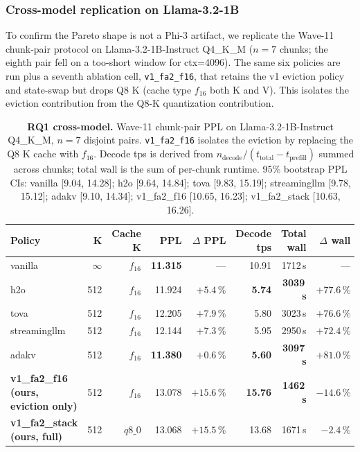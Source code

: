 \documentclass[sigconf, anonymous=false, screen=true]{acmart}
\newcommand{\good}[1]{\textcolor{endurkvgreen}{\textbf{#1}}}
\newcommand{\bad}[1]{\textcolor{endurkvred}{\textbf{#1}}}
\begin{document}
\subsubsection{Cross-model replication on Llama-3.2-1B}
\label{sec:llama1b-wave11}

To confirm the Pareto shape is not a Phi-3 artifact, we replicate the Wave-11 chunk-pair protocol on Llama-3.2-1B-Instruct Q4\_K\_M ($n{=}7$ chunks; the eighth pair fell on a too-short window for ctx=4096). The same six policies are run plus a seventh ablation cell, \texttt{v1\_fa2\_f16}, that retains the v1 eviction policy and state-swap but drops Q8 K (cache type $f_{16}$ both K and V). This isolates the eviction contribution from the Q8-K quantization contribution.

\begin{table}[t]
\caption{\textbf{RQ1 cross-model.} Wave-11 chunk-pair PPL on Llama-3.2-1B-Instruct Q4\_K\_M, $n{=}7$ disjoint pairs. \texttt{v1\_fa2\_f16} isolates the eviction by replacing the Q8 K cache with $f_{16}$. Decode tps is derived from $n_{\text{decode}} / (t_{\text{total}} - t_{\text{prefill}})$ summed across chunks; total wall is the sum of per-chunk runtime. 95\% bootstrap PPL CIs: vanilla [9.04, 14.28]; h2o [9.64, 14.84]; tova [9.83, 15.19]; streamingllm [9.78, 15.12]; adakv [9.10, 14.34]; v1\_fa2\_f16 [10.65, 16.23]; v1\_fa2\_stack [10.63, 16.26].}
\label{tab:wave11-llama1b}
\centering
\small
\begin{tabular}{lrrrrrrr}
\toprule
\textbf{Policy} & \textbf{K} & \textbf{Cache K} & \textbf{PPL} & \textbf{$\Delta$ PPL} & \textbf{Decode tps} & \textbf{Total wall} & \textbf{$\Delta$ wall} \\
\midrule
vanilla         & $\infty$ & $f_{16}$ & \good{11.315} & ---           & 10.91 & 1712\,s & --- \\
h2o             & 512 & $f_{16}$ & 11.924 & $+5.4\,\%$    & \bad{5.74}  & \bad{3039\,s} & $+77.6\,\%$ \\
tova            & 512 & $f_{16}$ & 12.205 & $+7.9\,\%$    & 5.80  & 3023\,s & $+76.6\,\%$ \\
streamingllm    & 512 & $f_{16}$ & 12.144 & $+7.3\,\%$    & 5.95  & 2950\,s & $+72.4\,\%$ \\
adakv~\cite{feng2025adakv}      & 512 & $f_{16}$ & \good{11.380} & \good{$+0.6\,\%$} & \bad{5.60} & \bad{3097\,s} & $+81.0\,\%$ \\
\textbf{v1\_fa2\_f16 (ours, eviction only)} & 512 & $f_{16}$ & 13.078 & $+15.6\,\%$ & \good{15.76} & \good{1462\,s} & \good{$-14.6\,\%$} \\
\textbf{v1\_fa2\_stack (ours, full)}        & 512 & $q8\_0$  & 13.068 & $+15.5\,\%$ & 13.68 & 1671\,s & $-2.4\,\%$ \\
\bottomrule
\end{tabular}
\end{table}
\end{document}
